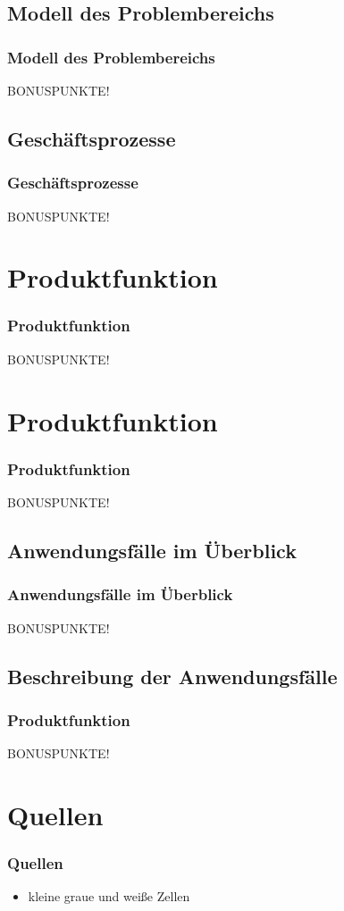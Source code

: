 \documentclass{beamer}
\begin{document}
\subsection{Modell des Problembereichs}		
\begin{frame}
\frametitle{Modell des Problembereichs}
BONUSPUNKTE!
\end{frame}

\subsection{Geschäftsprozesse}		
\begin{frame}
\frametitle{Geschäftsprozesse}
BONUSPUNKTE!
\end{frame}

\section{Produktfunktion}		
\begin{frame}
\frametitle{Produktfunktion}
BONUSPUNKTE!
\end{frame}

\section{Produktfunktion}		
\begin{frame}
\frametitle{Produktfunktion}
BONUSPUNKTE!
\end{frame}

\subsection{Anwendungsfälle im Überblick}		
\begin{frame}
\frametitle{Anwendungsfälle im Überblick}
BONUSPUNKTE!
\end{frame}

\subsection{Beschreibung der Anwendungsfälle}		
\begin{frame}
\frametitle{Produktfunktion}
BONUSPUNKTE!
\end{frame}

\section{Quellen}
\begin{frame}
		\frametitle{Quellen}
		\begin{itemize}
		  \item kleine graue und weiße Zellen
		\end{itemize}
	\end{frame}
\end{document}
